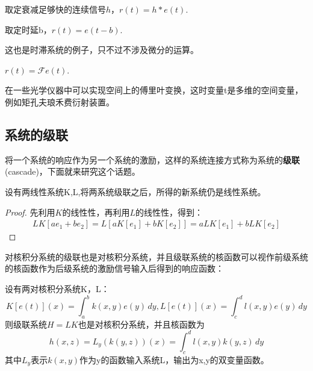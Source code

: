 \documentclass{ctexbook}
\begin{document}

\begin{example}[卷积]
    取定衰减足够快的连续信号$h$，$r(t)=h*e(t)$.
\end{example}

\begin{example}[信号平移]
    取定时延b，$r(t)=e(t-b)$.
\end{example}
这也是时滞系统的例子，只不过不涉及微分的运算。

\begin{example}[傅里叶变换]
$r(t)=\mathcal{F} e(t)$.

在一些光学仪器中可以实现空间上的傅里叶变换，这时变量t是多维的空间变量，例如矩孔夫琅禾费衍射装置。
\end{example}

\subsection{系统的级联}\label{sub:cascade}
将一个系统的响应作为另一个系统的激励，这样的系统连接方式称为系统的\textbf{级联}(cascade)，下面就来研究这个话题。
\begin{theorem}[线性系统的级联]
    设有两线性系统K,L,将两系统级联之后，所得的新系统仍是线性系统。
\end{theorem}
\begin{proof}
    先利用$K$的线性性，再利用$L$的线性性，得到：
    \begin{align*}
    LK[ae_1+be_2]=L[aK[e_1]+bK[e_2]]=aLK[e_1]+bLK[e_2]
\end{align*}
\end{proof}

对核积分系统的级联也是对核积分系统，并且级联系统的核函数可以视作前级系统的核函数作为后级系统的激励信号输入后得到的响应函数：
\begin{proposition}[对核积分系统的级联]
    设有两对核积分系统K，L：
    \[K[e(t)](x)=\int_{a}^{b}k(x,y)e(y)\,dy,L[e(t)](x)=\int_{c}^{d}l(x,y)e(y)\,dy\]
则级联系统$H=LK$也是对核积分系统，并且核函数为\begin{equation*}
    h(x,z)=L_y(k(y,z))(x)=\int_{c}^{d}l(x,y)k(y,z)\,dy
\end{equation*}
其中$L_y$表示$k(x,y)$作为y的函数输入系统L，输出为x,y的双变量函数。
\end{proposition}
\end{document}
